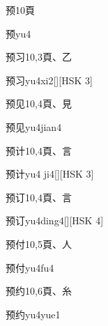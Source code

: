 \begin{entry}{预}{10}{⾴}
  \begin{phonetics}{预}{yu4}
  \end{phonetics}
\end{entry}

\begin{entry}{预习}{10,3}{⾴、⼄}
  \begin{phonetics}{预习}{yu4xi2}[][HSK 3]
  \end{phonetics}
\end{entry}

\begin{entry}{预见}{10,4}{⾴、⾒}
  \begin{phonetics}{预见}{yu4jian4}
  \end{phonetics}
\end{entry}

\begin{entry}{预计}{10,4}{⾴、⾔}
  \begin{phonetics}{预计}{yu4 ji4}[][HSK 3]
  \end{phonetics}
\end{entry}

\begin{entry}{预订}{10,4}{⾴、⾔}
  \begin{phonetics}{预订}{yu4ding4}[][HSK 4]
  \end{phonetics}
\end{entry}

\begin{entry}{预付}{10,5}{⾴、⼈}
  \begin{phonetics}{预付}{yu4fu4}
  \end{phonetics}
\end{entry}

\begin{entry}{预约}{10,6}{⾴、⽷}
  \begin{phonetics}{预约}{yu4yue1}
  \end{phonetics}
\end{entry}

